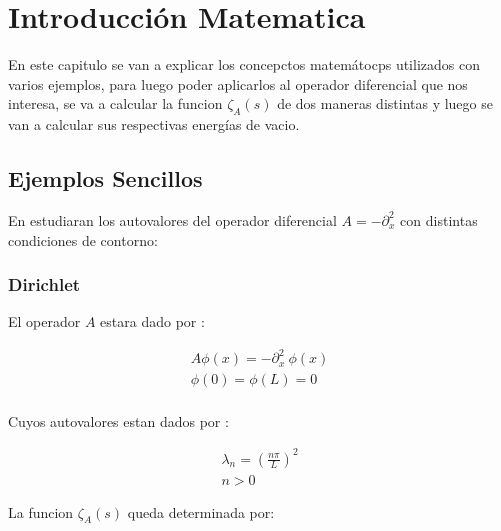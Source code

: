 \chapter{Introducción Matematica}

    
    En este capitulo se van a explicar los concepctos matemátocps utilizados con varios ejemplos, para luego poder aplicarlos al operador diferencial que nos interesa, se va a calcular la funcion $ \zeta _A (s) $ de dos maneras distintas y luego se van a calcular sus respectivas energías de vacio.

\section{Ejemplos Sencillos}

En estudiaran los autovalores del operador diferencial $A = - \partial ^2 _x$ con distintas condiciones de contorno:

\subsection{Dirichlet}

El operador $A$ estara dado por : 

\begin{equation}
\begin{array}{c}
    A \phi (x) = - \partial ^2 _x \ \phi (x)  \\
    \phi (0) = \phi(L) = 0 \\ 
\end{array}
\end{equation}

Cuyos autovalores estan dados por  : 

\begin{equation}
\begin{array}{c}
	\lambda _n = \left( \frac{n \pi }{L} \right) ^2 \\
	n > 0
\end{array}
\end{equation}

La funcion $\zeta _A (s)$ queda determinada por:


